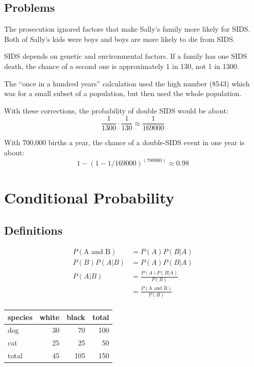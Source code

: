 \documentclass[landscape]{exam}
\begin{document}
  \subsection{Problems}

  The prosecution ignored factors that make Sally's family more likely for
  SIDS. Both of Sally's kids were boys and boys are more likely to die from
  SIDS.

  SIDS depends on genetic and environmental factors. If a family has one SIDS
  death, the chance of a second one is approximately 1 in 130, not 1 in 1300.

  The ``once in a hundred years'' calculation used the high number (8543)
  which was for a small subset of a population, but then used the whole
  population.

  With these corrections, the probability of double SIDS would be about:
  \[
    \frac{1}{1300} \cdot \frac{1}{130} \approx \frac{1}{169000} 
  \]

  With 700,000 births a year, the chance of a double-SIDS event in one year is
  about:
  \[
    1 - (1 - 1/169000)^(700000) \approx 0.98
  \]

  \section{Conditional Probability}

  \subsection{Definitions}
  \begin{align*}
    P(\text{A and B}) & = P(A) P(B | A) \\
    P(B) P(A | B)     & = P(A) P(B | A) \\
    P(A | B)          & = \frac{P(A) P(B | A)}{P(B)} \\
                      & = \frac{P(\text{A and B})}{P(B)} \\
  \end{align*}

  \begin{table}[H]
    \begin{tabular}[H]{lrrr}
      \toprule
      species & white & black & total\\
      \midrule
      dog     & 30    & 70    & 100\\
      cat     & 25    & 25    & 50\\
      \midrule
      total   & 45    & 105   & 150\\
      \bottomrule
    \end{tabular}
  \end{table}
\end{document}
